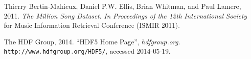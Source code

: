 \begin{thebibliography}{10}

Thierry Bertin-Mahieux, Daniel P.W. Ellis, Brian Whitman, and Paul Lamere,
2011.
\emph{The Million Song Dataset. In Proceedings of the 12th International Society}
\\for Music Information Retrieval Conference (ISMIR 2011).

The HDF Group,
2014.
``HDF5 Home Page'',
\emph{hdfgroup.org}.
\verb+http://www.hdfgroup.org/HDF5/+, accessed 2014-05-19.

\end{thebibliography}